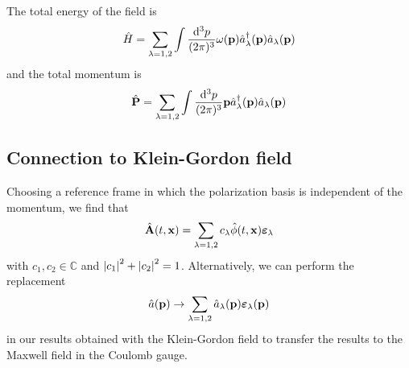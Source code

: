 The total energy of the field is
\begin{equation}
	\hat{H}
	=
	\sum_{\lambda=1,2}
	\int\frac{\dd[3]{p}}{(2\pi)^3}
	\omega(\vb{p})
	\hat{a}_\lambda^\dagger(\vb{p})
	\hat{a}_\lambda(\vb{p})
	\label{eq:qmw_total_energy}
\end{equation}
and the total momentum is
\begin{equation}
	\hat{\vb{P}}
	=
	\sum_{\lambda=1,2}
	\int\frac{\dd[3]{p}}{(2\pi)^3}
	\vb{p}
	\hat{a}_\lambda^\dagger(\vb{p})
	\hat{a}_\lambda(\vb{p})
	\label{eq:qmw_total_momentum}
\end{equation}

\subsection{Connection to Klein-Gordon field}

Choosing a reference frame in which the polarization basis is independent of the momentum, we find that
\begin{equation}
	\hat{\vb{A}}(t,\vb{x})
	=
	\sum_{\lambda=1,2}
	c_\lambda
	\hat\phi(t,\vb{x})
	\boldsymbol{\varepsilon}_\lambda
\end{equation}
with $c_1,c_2\in\mathbb{C}$ and $\abs{c_1}^2+\abs{c_2}^2=1$.
Alternatively, we can perform the replacement
\begin{equation}
	\hat{a}(\vb{p})
	\to
	\sum_{\lambda=1,2}
	\hat{a}_\lambda(\vb{p})
	\boldsymbol{\varepsilon}_\lambda(\vb{p})
\end{equation}
in our results obtained with the Klein-Gordon field to transfer the results to the Maxwell field in the Coulomb gauge.